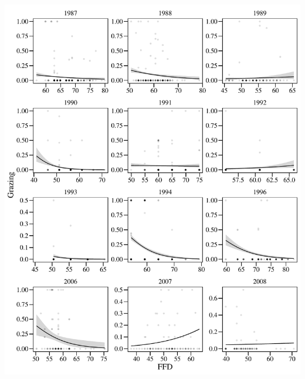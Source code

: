 \documentclass[
]{article}
\begin{document}
\includegraphics{lathyrus_ms3_3_after_rev_Ecology_files/figure-latex/unnamed-chunk-81-1.pdf}
\end{document}
